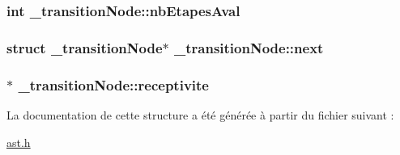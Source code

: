 \hypertarget{struct__transitionNode_aef1dc25f41e418fa2bfae7677f8eadea}{
\subsubsection[{nb\-Etapes\-Aval}]{\setlength{\rightskip}{0pt plus 5cm}int \-\_\-transition\-Node\-::nb\-Etapes\-Aval}}\label{struct__transitionNode_aef1dc25f41e418fa2bfae7677f8eadea}
\hypertarget{struct__transitionNode_a90e986b6201a33085afd4e19683852cd}{
\subsubsection[{next}]{\setlength{\rightskip}{0pt plus 5cm}struct {\bf \-\_\-transition\-Node}$\ast$ \-\_\-transition\-Node\-::next}}\label{struct__transitionNode_a90e986b6201a33085afd4e19683852cd}
\hypertarget{struct__transitionNode_a3b078e11bcb7db715b28984fe3483af8}{
\subsubsection[{receptivite}]{$\ast$ \-\_\-transition\-Node\-::receptivite}}\label{struct__transitionNode_a3b078e11bcb7db715b28984fe3483af8}


La documentation de cette structure a été générée à partir du fichier suivant \-:\begin{DoxyCompactItemize}
\item 
\hyperlink{ast_8h}{ast.\-h}\end{DoxyCompactItemize}
